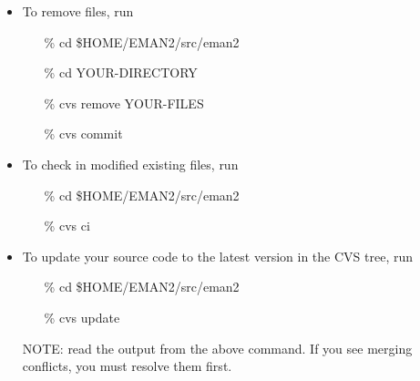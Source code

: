 \begin{itemize}
  \item To remove files, run
    \begin{itemize} \color{blue}
      \item[\%] cd \$HOME/EMAN2/src/eman2
      \item[\%] cd YOUR-DIRECTORY
      \item[\%] cvs remove YOUR-FILES
      \item[\%] cvs commit
    \end{itemize}

  \item To check in modified existing files, run
    \begin{itemize} \color{blue}
      \item[\%] cd \$HOME/EMAN2/src/eman2
      \item[\%] cvs ci
    \end{itemize}

  \item To update your source code to the latest version in the CVS tree, run
    \begin{itemize} \color{blue}
      \item[\%] cd \$HOME/EMAN2/src/eman2
      \item[\%] cvs update
    \end{itemize}
     NOTE: read the output from the above command. If you see merging conflicts, you must resolve them first.


\end{itemize}